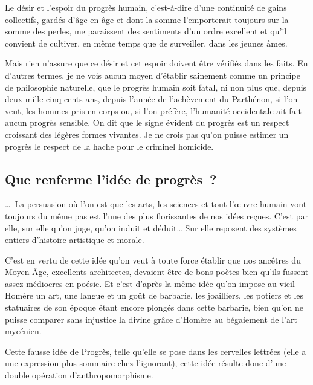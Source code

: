 \documentclass[french,twoside]{book} %
\newcommand{\astermono}{\medskip\centerline{\color{rubric}\large\selectfont{\syms ✻}}\medskip\par}%
\begin{document}
\noindent Le désir et l’espoir du progrès humain, c’est-à-dire d’une continuité de gains collectifs, gardés d’âge en âge et dont la somme l’emporterait toujours sur la somme des perles, me paraissent des sentiments d’un ordre excellent et qu’il convient de cultiver, en même temps que de surveiller, dans les jeunes âmes.\par
Mais rien n’assure que ce désir et cet espoir doivent être vérifiés dans les faits. En d’autres termes, je ne vois aucun moyen d’établir sainement comme un principe de philosophie naturelle, que le progrès humain soit fatal, ni non plus que, depuis deux mille cinq cents ans, depuis l’année de l’achèvement du Parthénon, si l’on veut, les hommes pris en corps ou, si l’on préfère, l’humanité occidentale ait fait aucun progrès sensible. On dit que le signe évident du progrès est un respect croissant des légères formes vivantes. Je ne crois pas qu’on puisse estimer un progrès le respect de la hache pour le criminel homicide.\par
\subsection[{Que renferme l’idée de progrès ?}]{Que renferme l’idée de progrès ?}
\noindent … La persuasion où l’on est que les arts, les sciences et tout l’œuvre humain vont toujours du même pas est l’une des plus florissantes de nos idées reçues. C’est par elle, sur elle qu’on juge, qu’on induit et déduit… Sur elle reposent des systèmes entiers d’histoire artistique et morale.\par
C’est en vertu de cette idée qu’on veut à toute force établir que nos ancêtres du Moyen Âge, excellents architectes, devaient être de bons poètes bien qu’ils fussent assez médiocres en poésie. Et c’est d’après la même idée qu’on impose au vieil Homère un art, une langue et un goût de barbarie, les joailliers, les potiers et les statuaires de son époque étant encore plongés dans cette barbarie, bien qu’on ne puisse comparer sans injustice la divine grâce d’Homère au bégaiement de l’art mycénien.\par

\astermono

\noindent Cette fausse idée de Progrès, telle qu’elle se pose dans les cervelles lettrées (elle a une expression plus sommaire chez l’ignorant), cette idée résulte donc d’une double opération d’anthropomorphisme.\par
\end{document}
